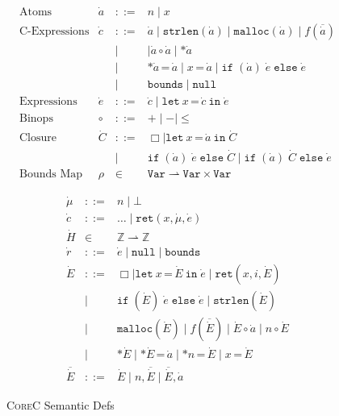 \documentclass[conference]{IEEEtran}
\newcommand{\elang}{\textsc{CoreC}\xspace}
\newcommand{\kw}[1]{\ensuremath{\mathtt{#1}}}
\newcommand{\estrlen}[1]{\ensuremath{\kw{strlen}({#1})}}
\newcommand{\emalloc}[1]{\ensuremath{\kw{malloc}({#1})}}
\newcommand{\ecall}[2]{\ensuremath{{#1}({#2})}}
\newcommand{\elet}[3]{\ensuremath{\kw{let}~#1\, \texttt{=}\, #2~\kw{in}\;{#3}}}
\newcommand{\eassign}[2]{\ensuremath{\texttt{*}{#1}\,\texttt{=}\, {#2}}}
\newcommand{\eassignstack}[2]{\ensuremath{{#1}\,\texttt{=}\, {#2}}}
\newcommand{\estar}[1]{\ensuremath{\texttt{*}{#1}}}
\newcommand{\eif}[3]{\ensuremath{\kw{if\;}(#1)\;{#2}\;\kw{else}\;{#3}}}
\newcommand{\ebounds}{\ensuremath{\kw{bounds}}}
\newcommand{\enull}{\ensuremath{\kw{null}}}
\newcommand{\hole}{\ensuremath{\Box}}
\newcommand{\eret}[3]{\ensuremath{\kw{ret}({#1},{#2},{#3})}}
\begin{document}
\begin{figure}[h]
{\small
  \[\begin{array}{llcl}
      \text{Atoms}       & \dot a & ::= & n \mid x \\

      \text{C-Expressions} & \dot c & ::= & \dot a \mid \estrlen{\dot a}  \mid \emalloc {\dot  a}  \mid \ecall{f} {\overline{\dot a}}  \\
                         & & \mid &  \mid  \dot a \circ \dot a \mid \estar{\dot a} \\
                         & & \mid & \eassign{\dot a}{\dot a} \mid \eassignstack{x}{\dot a}  \mid \eif{\dot a}{\dot e}{\dot e} \\
                         & & \mid & \ebounds \mid \enull \\
      \text{Expressions}  & \dot e & ::= & \dot c \mid \elet{x}{\dot c}{\dot e}\\
      \text{Binops} & \circ & ::= & + \mid - \mid \leq  \\
      \text{Closure} & \dot C & ::= & \hole \mid \elet{x}{\dot a}{\dot C} \\
       & & \mid & \eif{\dot a}{\dot e}{\dot C} \mid \eif{\dot a}{\dot    C}{\dot e} \\
      \text{Bounds Map} & \rho & \in & \texttt{Var} \rightharpoonup \texttt{Var} \times \texttt{Var}
  \end{array}
  \]
}
  \caption{\elang{} Syntax}
  \label{fig:syntaxerased}
{\small
  \[\begin{array}{lll}
    \dot \mu & ::= & n \mid \bot \\
    \dot c & ::= & \ldots  \mid \eret{x}{\dot \mu}{\dot e} \\
    \dot H & \in & \mathbb{Z} \rightharpoonup \mathbb{Z} \\
    \dot r & ::= & \dot e \mid \enull \mid \ebounds \\
    \dot E & ::= & \hole \mid  \elet{x}{\dot E}{\dot e}  \mid \eret{x}{i}{\dot E} \\
             & \mid & \eif{\dot E}{\dot e}{\dot e} \mid \estrlen{\dot E} \\
             & \mid & \emalloc{\dot E} \mid \ecall{f}{\overline{\dot
                      E}} \mid \dot E \circ \dot a \mid n \circ \dot E \\
             & \mid & \estar{\dot E} \mid \eassign{\dot E}{\dot a}
                      \mid \eassign{n}{\dot E} \mid
                      \eassignstack{x}{\dot E} \\
      \overline{\dot E } & ::= & \dot E \mid n,\overline{\dot E} \mid
                                 \overline{\dot E}, \dot a

  \end{array} \]
}
  \caption{\elang Semantic Defs}
  \label{fig:semanticserased}
\end{figure}
\end{document}
